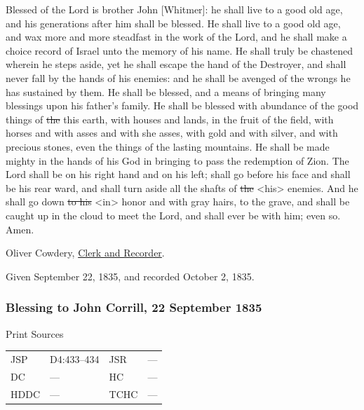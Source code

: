 				Blessed of the Lord is brother John [Whitmer]: he shall live to a good old age, and his generations after him shall be blessed. He shall live to a good old age, and wax more and more steadfast in the work of the Lord, and he shall make a choice record of Israel unto the memory of his name. He shall truly be chastened wherein he steps aside, yet he shall escape the hand of the Destroyer, and shall never fall by the hands of his enemies: and he shall be avenged of the wrongs he has sustained by them. He shall be blessed, and a means of bringing many blessings upon his father's family. He shall be blessed with abundance of the good things of \sout{the} this earth, with houses and lands, in the fruit of the field, with horses and with asses and with she asses, with gold and with silver, and with precious stones, even the things of the lasting mountains. He shall be made mighty in the hands of his God in bringing to pass the redemption of Zion. The Lord shall be on his right hand and on his left; shall go before his face and shall be his rear ward, and shall turn aside all the shafts of \sout{the} <his> enemies. And he shall go down \sout{to his} <in> honor and with gray hairs, to the grave, and shall be caught up in the cloud to meet the Lord, and shall ever be with him; even so. Amen.
				
				\begin{tightright}
				Oliver Cowdery, \uline{Clerk and Recorder}.
				\end{tightright}
				
				Given September 22, 1835, and recorded October 2, 1835.
				
		\subsubsection{Blessing to John Corrill, 22 September 1835}
			\label{EMS-1835-JS-22-SEP-1835-JC}
			
			\begin{description}
				\item[Print Sources]
			\end{description}

				\begin{tabular}{p{0.5in}p{1in}p{0.5in}p{1in}}
				JSP	 	& D4:433--434		& JSR 		& --- \\
				DC	 	& --- 		& HC 		& --- \\
				HDDC 	& ---		& TCHC 		& --- \\
				\end{tabular}
			
